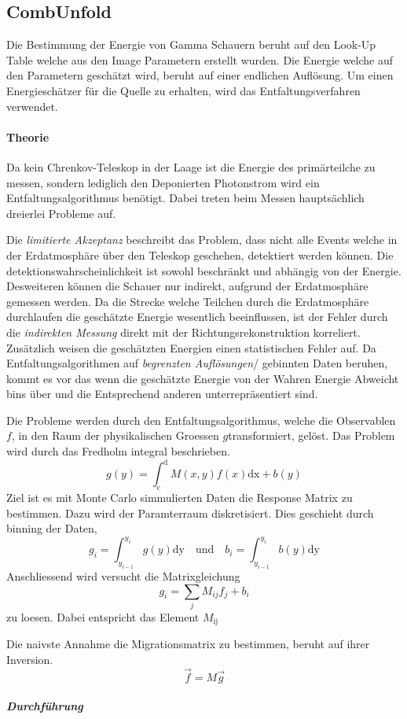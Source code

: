\subsection{CombUnfold}%
\label{sub:combunfold}
Die Bestimmung der Energie von Gamma Schauern beruht auf den Look-Up Table
welche aus den Image Parametern erstellt wurden. 
Die Energie welche auf den Parametern geschätzt wird, beruht auf einer 
endlichen Auflösung.
Um einen Energieschätzer für die Quelle zu erhalten, 
wird das Entfaltungsverfahren verwendet.

\paragraph{Theorie}%
\label{par:theorie}
Da kein Chrenkov-Teleskop in der Laage ist die Energie 
des primärteilche zu messen,
sondern lediglich den Deponierten Photonstrom wird ein Entfaltungsalgorithmus
benötigt.
Dabei treten beim Messen hauptsächlich dreierlei Probleme auf.

Die \textit{limitierte Akzeptanz} beschreibt das Problem, 
dass nicht alle Events welche in der Erdatmosphäre über den Teleskop geschehen,
detektiert werden können. 
Die detektionswahrscheinlichkeit ist sowohl beschränkt 
und abhängig von der Energie.
Desweiteren können die Schauer nur indirekt, 
aufgrund der Erdatmosphäre gemessen werden.
Da die Strecke welche Teilchen durch die Erdatmosphäre durchlaufen die
geschätzte Energie wesentlich beeinflussen,
ist der Fehler durch die \textit{indirekten Messung} direkt mit der
Richtungsrekonstruktion korreliert.
Zusätzlich weisen die geschätzten Energien einen statistischen Fehler auf. 
Da Entfaltungsalgorithmen auf \textit{begrenzten Auflösungen}/ gebinnten Daten
beruhen, kommt es vor das wenn die geschätzte Energie von der Wahren Energie
Abweicht bins über und die Entsprechend anderen unterrepräsentiert sind.

Die Probleme werden durch den Entfaltungsalgorithmus,
welche die Observablen $f$,
in den Raum der physikalischen Groessen $g$transformiert,
gelöst.
Das Problem wird durch das Fredholm integral beschrieben.
\begin{equation}
	g(y) = \int_\text{c}^\text{d} M(x,y) f(x) \text{dx} + b(y)
\end{equation}
Ziel ist es mit Monte Carlo simmulierten Daten die Response Matrix zu bestimmen.
Dazu wird der Paramterraum diskretisiert.
Dies geschieht durch binning der Daten,
\begin{equation}
	g_i = \int_{y_{i-1}}^{y_i} g(y) \text{dy} \quad \text{und} \quad
	b_i = \int_{y_{i-1}}^{y_i} b(y) \text{dy}
\end{equation}
Anschliessend wird versucht die Matrixgleichung 
\begin{equation}
	g_i = \sum_j M_{ij} f_j + b_i
\end{equation}
zu loesen.
Dabei entspricht das Element $M_\text{ij}$


Die naivste Annahme die Migrationsmatrix zu bestimmen,
beruht auf ihrer Inversion.
\begin{equation}
    \vec{f} = M \vec{g}
\end{equation}

\subparagraph{Durchführung}%
\label{par:durchfuhrung}


